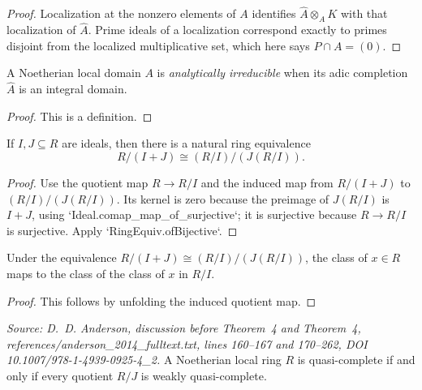 \begin{proof}
  Localization at the nonzero elements of \(A\) identifies
  \(\widehat A\otimes_A K\) with that localization of \(\widehat A\).
  Prime ideals of a localization correspond exactly to primes disjoint from
  the localized multiplicative set, which here says \(P\cap A=(0)\).
\end{proof}

\begin{definition}
  \label{def:analytically_irreducible}
  A Noetherian local domain \(A\) is \emph{analytically irreducible} when its
  adic completion \(\widehat A\) is an integral domain.
\end{definition}

\begin{proof}
  This is a definition.
\end{proof}

\begin{lemma}
  \label{lem:quotient_sup_quotient_equiv}
  If \(I,J\subseteq R\) are ideals, then there is a natural ring equivalence
  \[
    R/(I+J)\cong (R/I)/(J(R/I)).
  \]
\end{lemma}

\begin{proof}
  Use the quotient map \(R\to R/I\) and the induced map from \(R/(I+J)\) to
  \((R/I)/(J(R/I))\).  Its kernel is zero because the preimage of \(J(R/I)\)
  is \(I+J\), using `Ideal.comap_map_of_surjective`; it is surjective because
  \(R\to R/I\) is surjective.  Apply `RingEquiv.ofBijective`.
\end{proof}

\begin{lemma}
  \label{lem:quotient_sup_quotient_equiv_mk}
  Under the equivalence \(R/(I+J)\cong (R/I)/(J(R/I))\), the class of
  \(x\in R\) maps to the class of the class of \(x\) in \(R/I\).
\end{lemma}

\begin{proof}
  This follows by unfolding the induced quotient map.
\end{proof}

\begin{lemma}
  \label{lem:quotient_weak_characterization}
  \textit{Source: D.~D. Anderson, discussion before Theorem~4 and
  Theorem~4, references/anderson\_2014\_fulltext.txt, lines 160--167 and
  170--262, DOI 10.1007/978-1-4939-0925-4\_2.}
  A Noetherian local ring \(R\) is quasi-complete if and only if every quotient
  \(R/J\) is weakly quasi-complete.
\end{lemma}

